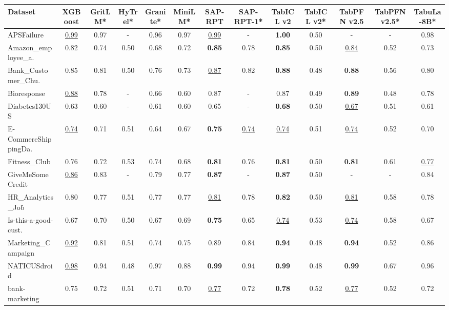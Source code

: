 \begin{table}[t]
\footnotesize
\centering
\begin{tabular*}{\textwidth}{@{\extracolsep{\fill}} l c c c c c c c c c c c c @{{}}}
\hline
Dataset & XGBoost & GritLM* & HyTrel* & Granite* & MiniLM* & SAP-RPT & SAP-RPT-1* & TabICL v2 & TabICL v2* & TabPFN v2.5 & TabPFN v2.5* & TabuLa-8B* \\
\hline
APSFailure & \underline{0.99} & 0.97 & - & 0.96 & 0.97 & \underline{0.99} & - & \textbf{1.00} & 0.50 & - & - & 0.98 \\
Amazon\_employee\_a. & 0.82 & 0.74 & 0.50 & 0.68 & 0.72 & \textbf{0.85} & 0.78 & \textbf{0.85} & 0.50 & \underline{0.84} & 0.52 & 0.73 \\
Bank\_Customer\_Chu. & 0.85 & 0.81 & 0.50 & 0.76 & 0.73 & \underline{0.87} & 0.82 & \textbf{0.88} & 0.48 & \textbf{0.88} & 0.56 & 0.80 \\
Bioresponse & \underline{0.88} & 0.78 & - & 0.66 & 0.60 & 0.87 & - & 0.87 & 0.49 & \textbf{0.89} & 0.48 & 0.78 \\
Diabetes130US & 0.63 & 0.60 & - & 0.61 & 0.60 & 0.65 & - & \textbf{0.68} & 0.50 & \underline{0.67} & 0.51 & 0.61 \\
E-CommereShippingDa. & \underline{0.74} & 0.71 & 0.51 & 0.64 & 0.67 & \textbf{0.75} & \underline{0.74} & \underline{0.74} & 0.51 & \underline{0.74} & 0.52 & 0.70 \\
Fitness\_Club & 0.76 & 0.72 & 0.53 & 0.74 & 0.68 & \textbf{0.81} & 0.76 & \textbf{0.81} & 0.50 & \textbf{0.81} & 0.61 & \underline{0.77} \\
GiveMeSomeCredit & \underline{0.86} & 0.83 & - & 0.79 & 0.77 & \textbf{0.87} & - & \textbf{0.87} & 0.50 & - & - & 0.84 \\
HR\_Analytics\_Job\. & 0.80 & 0.77 & 0.51 & 0.77 & 0.77 & \underline{0.81} & 0.78 & \textbf{0.82} & 0.50 & \underline{0.81} & 0.58 & 0.78 \\
Is-this-a-good-cust. & 0.67 & 0.70 & 0.50 & 0.67 & 0.69 & \textbf{0.75} & 0.65 & \underline{0.74} & 0.53 & \underline{0.74} & 0.58 & 0.67 \\
Marketing\_Campaign & \underline{0.92} & 0.81 & 0.51 & 0.74 & 0.75 & 0.89 & 0.84 & \textbf{0.94} & 0.48 & \textbf{0.94} & 0.52 & 0.86 \\
NATICUSdroid & \underline{0.98} & 0.94 & 0.48 & 0.97 & 0.88 & \textbf{0.99} & 0.94 & \textbf{0.99} & 0.48 & \textbf{0.99} & 0.67 & 0.96 \\
bank-marketing & 0.75 & 0.72 & 0.51 & 0.71 & 0.70 & \underline{0.77} & 0.72 & \textbf{0.78} & 0.52 & \underline{0.77} & 0.52 & 0.72 \\

\end{tabular*}
\end{table}

